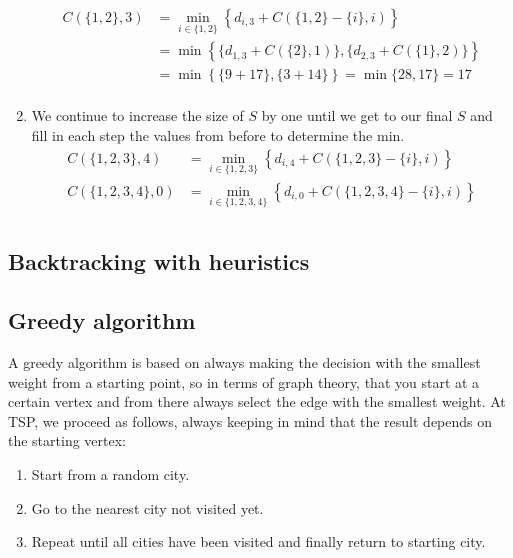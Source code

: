 \begin{enumerate}
    \begin{align*}
        C(\{1,2\},3)&=\min_{i\in\{1,2\}}\left\{d_{i,3}+C(\{1,2\}-\{i\},i)\right\}\\
        &=\min\left\{\{d_{1,3}+C(\{2\},1)\},\{d_{2,3}+C(\{1\},2)\}\right\}\\
        &=\min\left\{\{9+17\},\{3+14\}\right\}=\min\{28,17\}=17\\
    \end{align*}
    \item We continue to increase the size of $S$ by one until we get to our final $S$ and fill in each step the values from before to determine the min. 
    \begin{align*}
        C(\{1,2,3\},4)&=\min_{i\in\{1,2,3\}}\left\{d_{i,4}+C(\{1,2,3\}-\{i\},i)\right\}\\
        C(\{1,2,3,4\},0)&=\min_{i\in\{1,2,3,4\}}\left\{d_{i,0}+C(\{1,2,3,4\}-\{i\},i)\right\}\\
    \end{align*}
\end{enumerate}

%

\subsection{Backtracking with heuristics}



%

\subsection{Greedy algorithm}

A greedy algorithm is based on always making the decision with the smallest weight from a starting point, so in terms of graph theory, that you start at a certain vertex and from there always select the edge with the smallest weight. At TSP, we proceed as follows, always keeping in mind that the result depends on the starting vertex:

\begin{enumerate}
    \item Start from a random city.
    \item Go to the nearest city not visited yet.
    \item Repeat until all cities have been visited and finally return to starting city.
\end{enumerate}

